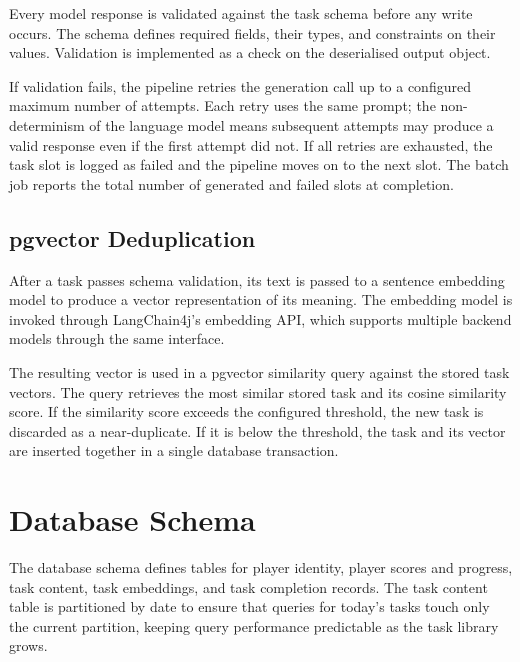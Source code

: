 Every model response is validated against the task schema before any write occurs. The schema defines required fields, their types, and constraints on their values. Validation is implemented as a check on the deserialised output object.

If validation fails, the pipeline retries the generation call up to a configured maximum number of attempts. Each retry uses the same prompt; the non-determinism of the language model means subsequent attempts may produce a valid response even if the first attempt did not. If all retries are exhausted, the task slot is logged as failed and the pipeline moves on to the next slot. The batch job reports the total number of generated and failed slots at completion.


\subsection{pgvector Deduplication}

After a task passes schema validation, its text is passed to a sentence embedding model to produce a vector representation of its meaning. The embedding model is invoked through LangChain4j's embedding API, which supports multiple backend models through the same interface.

The resulting vector is used in a pgvector similarity query against the stored task vectors. The query retrieves the most similar stored task and its cosine similarity score. If the similarity score exceeds the configured threshold, the new task is discarded as a near-duplicate. If it is below the threshold, the task and its vector are inserted together in a single database transaction.


\section{Database Schema}

The database schema defines tables for player identity, player scores and progress, task content, task embeddings, and task completion records. The task content table is partitioned by date to ensure that queries for today's tasks touch only the current partition, keeping query performance predictable as the task library grows.

